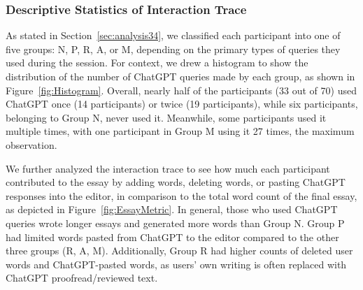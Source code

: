 \documentclass[manuscript,screen,acmsmall]{acmart}
\begin{document}
\subsubsection{Descriptive Statistics of Interaction Trace}
\label{sec:interactiontrace}


As stated in Section~\ref{sec:analysis34}, we classified each participant into one of five groups: N, P, R, A, or M, depending on the primary types of queries they used during the session. For context, we drew a histogram to show the distribution of the number of ChatGPT queries made by each group, as shown in Figure~\ref{fig:Histogram}. Overall, nearly half of the participants (33 out of 70) used ChatGPT once (14 participants) or twice (19 participants), while six participants, belonging to Group N, never used it. Meanwhile, some participants used it multiple times, with one participant in Group M using it 27 times, the maximum observation.

We further analyzed the interaction trace to see how much each participant contributed to the essay by adding words, deleting words, or pasting ChatGPT responses into the editor, in comparison to the total word count of the final essay, as depicted in Figure~\ref{fig:EssayMetric}.
In general, those who used ChatGPT queries wrote longer essays and generated more words than Group N. Group P had limited words pasted from ChatGPT to the editor compared to the other three groups (R, A, M). Additionally, Group R had higher counts of deleted user words and ChatGPT-pasted words, as users' own writing is often replaced with ChatGPT proofread/reviewed text.
\end{document}
